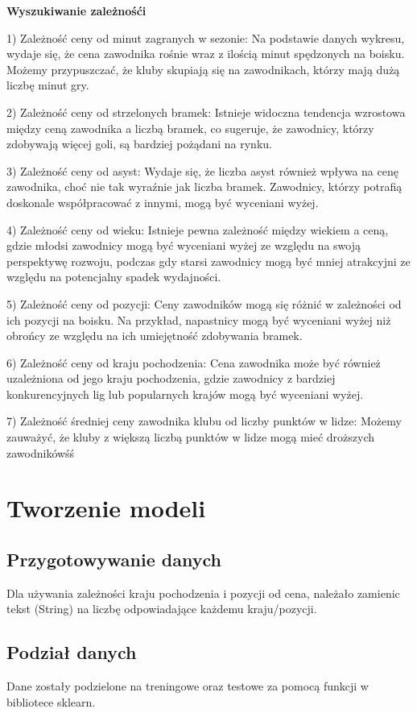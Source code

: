 \documentclass{article}
\begin{document}
\textbf{Wyszukiwanie zależnośći}


1) Zależność ceny od minut zagranych w sezonie: Na podstawie danych wykresu, wydaje się, że cena zawodnika rośnie wraz z ilością minut spędzonych na boisku. Możemy przypuszczać, że kluby skupiają się na zawodnikach, którzy mają dużą liczbę minut gry.

2) Zależność ceny od strzelonych bramek: Istnieje widoczna tendencja wzrostowa między ceną zawodnika a liczbą bramek, co sugeruje, że zawodnicy, którzy zdobywają więcej goli, są bardziej pożądani na rynku.

3) Zależność ceny od asyst: Wydaje się, że liczba asyst również wpływa na cenę zawodnika, choć nie tak wyraźnie jak liczba bramek. Zawodnicy, którzy potrafią doskonale współpracować z innymi, mogą być wyceniani wyżej.

4) Zależność ceny od wieku: Istnieje pewna zależność między wiekiem a ceną, gdzie młodsi zawodnicy mogą być wyceniani wyżej ze względu na swoją perspektywę rozwoju, podczas gdy starsi zawodnicy mogą być mniej atrakcyjni ze względu na potencjalny spadek wydajności.

5) Zależność ceny od pozycji: Ceny zawodników mogą się różnić w zależności od ich pozycji na boisku. Na przykład, napastnicy mogą być wyceniani wyżej niż obrońcy ze względu na ich umiejętność zdobywania bramek.

6) Zależność ceny od kraju pochodzenia: Cena zawodnika może być również uzależniona od jego kraju pochodzenia, gdzie zawodnicy z bardziej konkurencyjnych lig lub popularnych krajów mogą być wyceniani wyżej.

7) Zależność średniej ceny zawodnika klubu od liczby punktów w lidze: Możemy zauważyć, że kluby z większą liczbą punktów w lidze mogą mieć droższych zawodnikówśś

\section{Tworzenie modeli}

\subsection{Przygotowywanie danych}
Dla używania zależności kraju pochodzenia i pozycji od cena, należało zamienic tekst (String) na liczbę odpowiadające każdemu kraju/pozycji.
\subsection{Podział danych}
Dane zostały podzielone na treningowe oraz testowe za pomocą funkcji w bibliotece sklearn.
\end{document}
